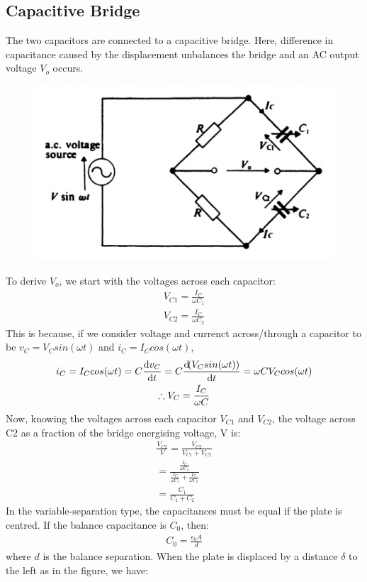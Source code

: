 \documentclass[class=report, crop=false, 12pt,a4paper]{standalone}
\begin{document}
\subsection{Capacitive Bridge}
The two capacitors are connected to a capacitive bridge. Here, difference in capacitance caused by the displacement unbalances the bridge and an AC output voltage $V_o$ occurs.
\begin{figure}[H]
  \centering
  \includegraphics[width = 0.6 \textwidth]{../img/Mdiagram5.PNG}
\end{figure}
To derive $V_o$, we start with the voltages across each capacitor:
\begin{gather}
  V_{C1} = \frac{I_C}{\omega C_1} \\
  V_{C2} = \frac{I_C}{\omega C_2}
\end{gather}
This is because, if we consider voltage and currenct across/through a capacitor to be $v_C = V_Csin(\omega t)$ and $i_C = I_Ccos(\omega t)$,
\begin{gather}
  i_C = I_Ccos(\omega t) = C\frac{\dif v_C}{\dif t} = C\frac{\dif(V_Csin(\omega t))}{\dif t} = \omega CV_Ccos(\omega t) \\
  \therefore V_C = \frac{I_C}{\omega C}
\end{gather}
Now, knowing the voltages across each capacitor $V_{C1}$ and $V_{C2}$, the voltage across C2 as a fraction of the bridge energising voltage, V is:
\begin{gather}
  \frac{V_{C2}}{V} = \frac{V_{C2}}{V_{C1}+V_{C2}} \\
  = \frac{\frac{I_C}{\omega C_2}}{\frac{I_C}{\omega C_1}+\frac{I_C}{\omega C_2}} \\
  = \frac{C_1}{C_1+C_2}
\end{gather}
In the variable-separation type, the capacitances must be equal if the plate is centred. If the balance capacitance is $C_0$, then:
\begin{gather}
  C_0 = \frac{\epsilon_0A}{d}
\end{gather}
where $d$ is the balance separation. When the plate is displaced by a distance $\delta$ to the left as in the figure, we have:
\end{document}
